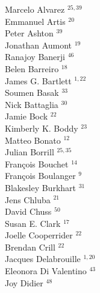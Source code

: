 \documentclass[PICOReport.tex]{subfiles}
\begin{document}
\footnotesize {

\begin{multicols}{4}
Marcelo Alvarez $^{25,39}$                 \\
Emmanuel Artis $^{20}$                  \\
Peter Ashton $^{39}$                    \\
Jonathan Aumont $^{19}$                 \\
Ranajoy Banerji $^{46}$                 \\
Belen Barreiro $^{18}$                  \\
James G. Bartlett $^{1,22}$               \\
Soumen Basak $^{33}$                    \\
Nick Battaglia $^{30}$                  \\
Jamie Bock $^{22}$                      \\
Kimberly K. Boddy $^{23}$               \\
Matteo Bonato $^{12}$                   \\
Julian Borrill $^{25,35}$                  \\
Fran\c{c}ois Bouchet $^{14}$            \\
Fran\c{c}ois Boulanger $^{9}$          \\
Blakesley Burkhart $^{31}$              \\
Jens Chluba $^{21}$                     \\
David Chuss $^{50}$                     \\
Susan E. Clark $^{17}$                  \\
Joelle Cooperrider $^{22}$              \\
Brendan Crill $^{22}$                   \\
Jacques Delabrouille $^{1,20}$            \\
Eleonora Di Valentino $^{43}$           \\
Joy Didier $^{48}$                      \\

\end{multicols}}
\end{document}
